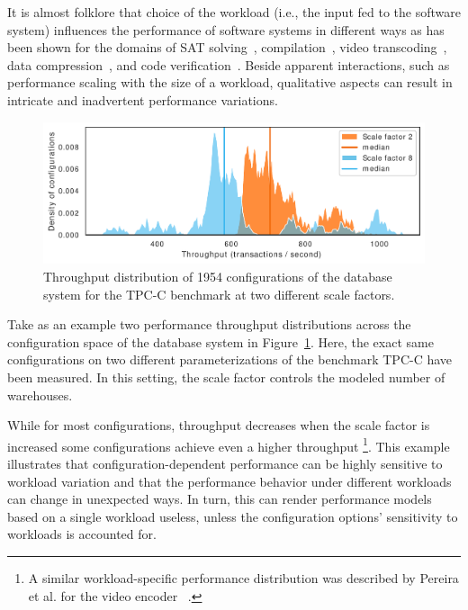 It is almost folklore that choice of the workload (i.e., the input fed to the software system) influences the performance of software systems in different ways as has been shown for the domains of SAT solving~\cite{falkner_sat_solvers_2015,satzilla_2008}, compilation~\cite{ding_compilation_2015,plotnikov_compilation_2013}, video transcoding~\cite{maxiaguine_workload_2004,alves_sampling_2020}, data compression~\cite{khavari_compression_2019}, and code verification~\cite{koc_satune_2021}. Beside apparent interactions, such as performance scaling with the size of a workload, qualitative aspects can result in intricate and inadvertent performance variations.

\begin{figure}
	\centering
	\includegraphics[width=\linewidth]{images/h2_intro.pdf}
	\caption{Throughput distribution of 1954 configurations of the database system \htwo for the \textsf{TPC-C} benchmark at two different scale factors.}
	\label{fig:h2_intro}
\end{figure}

Take as an example two performance throughput distributions across the configuration space of the database system \htwo in Figure~\ref{fig:h2_intro}. Here,  the exact same configurations on two different parameterizations of the benchmark \textsf{TPC-C} have been measured. In this setting, the scale factor controls the modeled number of warehouses. 

While for most configurations, throughput decreases when the scale factor is increased some configurations achieve even a higher throughput
\footnote{A similar workload-specific performance distribution was  described by Pereira et al. for the video encoder \xzwo~\cite{alves_sampling_2020}.}. This example illustrates that configuration-dependent performance can be highly sensitive to workload variation and that the performance behavior under different workloads can change in unexpected ways. In turn, this can render performance models based on a single workload useless, unless the configuration options’ sensitivity to workloads is accounted for.

